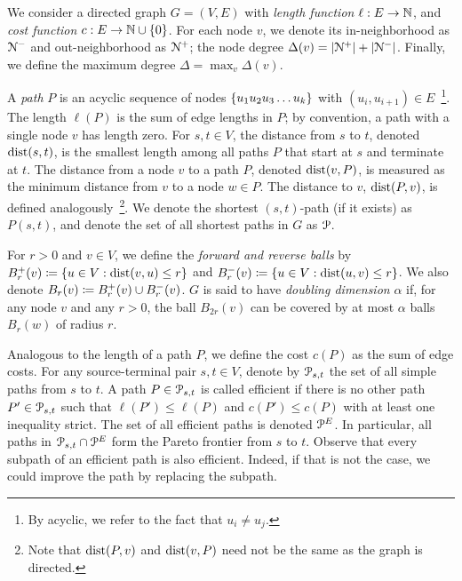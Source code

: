
We consider a directed graph $G=(V,E)$ with \emph{length function} $\ell:E\to \N$, and \emph{cost function} $c:E\to \N\cup\{0\}$.
For each node $v$, we denote its in-neighborhood as $\Nb$ and out-neighborhood as $\Nf$; the node degree $\Delta(v) = |\Nf|+|\Nb|$.
Finally, we define the maximum degree $\Delta = \max_v\Delta(v)$.


A \emph{path} $P$ is an acyclic sequence of nodes $\crl*{u_1u_2u_3\ldots u_k}$ with $(u_i,u_{i+1})\in E$~\footnote{By acyclic, we refer to the fact that $u_i\neq u_j$.}. 
The length $\ell(P)$ is the sum of edge lengths in $P$; by convention, a path with a single node $v$ has length zero.
For $s,t\in V$, the distance from $s$ to $t$, denoted $\dist(s,t)$, is the smallest length among all paths $P$ that start at $s$ and terminate at $t$.
The distance from a node $v$ to a path $P$, denoted $\dist(v,P)$, is measured as the minimum distance from $v$ to a node $w\in P$.
The distance to $v$, $\dist(P,v)$, is defined analogously~\footnote{Note that  $\dist(P,v)$ and  $\dist(v,P)$ need not be the same as the graph is directed.}.
We denote the shortest $(s,t)$-path (if it exists) as $P(s,t)$, and denote the set of all shortest paths in $G$ as $\calP$.



For $r>0$ and $v\in V$, we define the \emph{forward and reverse balls} by $\Bf_r(v)\defeq\{u\in V: \dist(v,u)\leq r\}$ and $\Bb_r(v)\defeq\{u\in V: \dist(u,v)\leq r\}$.
We also denote $B_r(v)\defeq\Bf_r(v)\cup\Bb_r(v)$.
$G$ is said to have \emph{doubling dimension} $\alpha$ if, for any node $v$ and any $r>0$, the ball $B_{2r}(v)$ can be covered by at most $\alpha$ balls $B_r(w)$ of radius $r$. 



Analogous to the length of a path $P$, we define the cost $c(P)$ as the sum of edge costs.
For any source-terminal pair $s,t\in V$, denote by $\calP_{s,t}$ the set of all simple paths from $s$ to $t$.
A path $P\in \calP_{s,t}$ is called efficient if there is no other path $P'\in \calP_{s,t}$ such that $\ell(P')\leq \ell(P)$ and $c(P')\leq c(P)$ with at least one inequality strict.
The set of all efficient paths is denoted $\PE$.
In particular, all paths in $\calP_{s,t}\cap\PE$ form the Pareto frontier from $s$ to $t$.
Observe that every subpath of an efficient path is also efficient.
Indeed, if that is not the case, we could improve the path by replacing the subpath.

